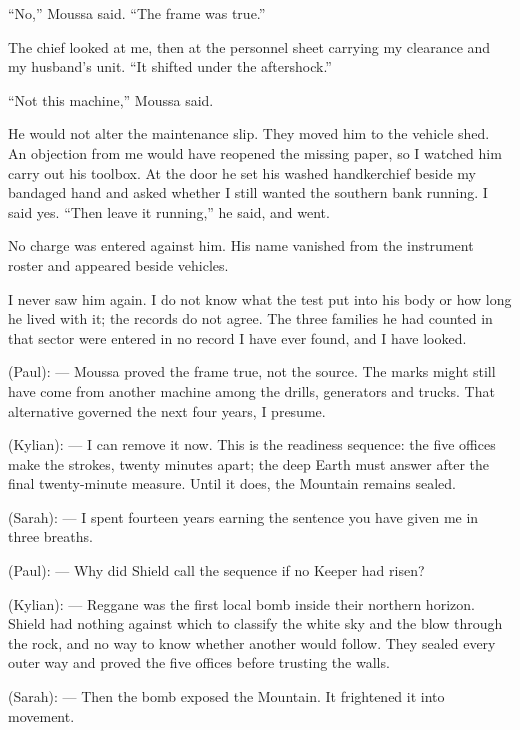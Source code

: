 “No,” Moussa said. “The frame was true.”\par

The chief looked at me, then at the personnel sheet carrying my clearance and my husband's unit. “It shifted under the aftershock.”\par

“Not this machine,” Moussa said.\par

He would not alter the maintenance slip. They moved him to the vehicle shed. An objection from me would have reopened the missing paper, so I watched him carry out his toolbox. At the door he set his washed handkerchief beside my bandaged hand and asked whether I still wanted the southern bank running. I said yes. “Then leave it running,” he said, and went.\par

No charge was entered against him. His name vanished from the instrument roster and appeared beside vehicles.\par

I never saw him again. I do not know what the test put into his body or how long he lived with it; the records do not agree. The three families he had counted in that sector were entered in no record I have ever found, and I have looked. \par

\begin{room}

(Paul): --- Moussa proved the frame true, not the source. The marks might still have come from another machine among the drills, generators and trucks. That alternative governed the next four years, I presume.

(Kylian): --- I can remove it now. This is the readiness sequence: the five offices make the strokes, twenty minutes apart; the deep Earth must answer after the final twenty-minute measure. Until it does, the Mountain remains sealed.

(Sarah): --- I spent fourteen years earning the sentence you have given me in three breaths.

(Paul): --- Why did Shield call the sequence if no Keeper had risen?

(Kylian): --- Reggane was the first local bomb inside their northern horizon. Shield had nothing against which to classify the white sky and the blow through the rock, and no way to know whether another would follow. They sealed every outer way and proved the five offices before trusting the walls.

(Sarah): --- Then the bomb exposed the Mountain. It frightened it into movement.

\end{room}


